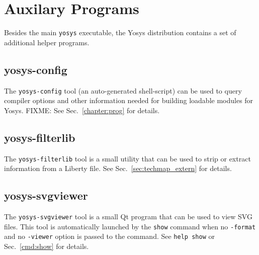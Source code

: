 
\chapter{Auxilary Programs}

Besides the main {\tt yosys} executable, the Yosys distribution contains a set
of additional helper programs.

\section{yosys-config}

The {\tt yosys-config} tool (an auto-generated shell-script) can be used to
query compiler options and other information needed for building loadable
modules for Yosys. FIXME: See Sec.~\ref{chapter:prog} for details.

\section{yosys-filterlib}
\label{sec:filterlib}

The {\tt yosys-filterlib} tool is a small utility that can be used to strip
or extract information from a Liberty file. See Sec.~\ref{sec:techmap_extern}
for details.

\section{yosys-svgviewer}

The {\tt yosys-svgviewer} tool is a small Qt program that can be used to view
SVG files. This tool is automatically launched by the {\tt show} command when
no {\tt -format} and no {\tt -viewer} option is passed to the command. See
{\tt help show} or Sec.~\ref{cmd:show} for details.

